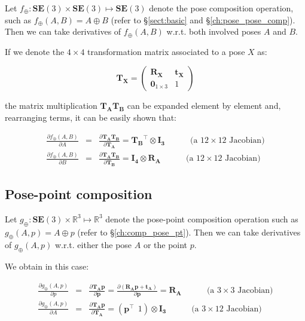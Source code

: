 \documentclass[a4paper,11pt]{report}
\begin{document}
Let $f_\oplus: \mathbf{SE}(3) \times \mathbf{SE}(3) \mapsto \mathbf{SE}(3)$ denote
the pose composition operation,
such as $f_\oplus(A,B) = A \oplus B$
(refer to \S\ref{sect:basic} and \S\ref{ch:pose_pose_comp}).
Then we can take derivatives of $f_\oplus(A,B)$ w.r.t. both involved poses $A$ and $B$.

If we denote the $4 \times 4$ transformation matrix associated to a pose $X$ as:

\begin{equation}
 \mathbf{T_X} =
\left(
\begin{array}{c|c}
  \mathbf{R_X} & \mathbf{t_X} \\
\hline
  \mathbf{0}_{1\times 3} & 1
\end{array}
\right)
\end{equation}

\noindent the matrix multiplication $\mathbf{T_A}\mathbf{T_B}$ can be
expanded element by element and, rearranging terms, it can be easily shown that:

\begin{eqnarray}
\label{eq:oplus.ab.wrt.a}
\frac{\partial f_\oplus(A,B) }{\partial A } &=&
\frac{\partial \mathbf{T_A}\mathbf{T_B} }{\partial \mathbf{T_A} } = \mathbf{T_B}^\top \otimes \mathbf{I_3}
\quad \quad \quad
\text{(a $12 \times 12$ Jacobian)}
\\
\label{eq:oplus.ab.wrt.b}
\frac{\partial f_\oplus(A,B) }{\partial B } &=&
\frac{\partial \mathbf{T_A}\mathbf{T_B} }{\partial \mathbf{T_B} } =
\mathbf{I_4} \otimes   \mathbf{R_A}
\quad \quad \quad
\text{(a $12 \times 12$ Jacobian)}
\end{eqnarray}


\subsection{Pose-point composition}

Let $g_\oplus: \mathbf{SE}(3) \times \mathbb{R}^3 \mapsto \mathbb{R}^3$ denote
the pose-point composition operation
such as $g_\oplus(A,p) = A \oplus p$
(refer to \S\ref{ch:comp_pose_pt}).
Then we can take derivatives of $g_\oplus(A,p)$ w.r.t. either the pose $A$ or the point $p$.

We obtain in this case:

\begin{eqnarray}
\label{eq:jac_dAp_p}
\frac{\partial g_\oplus(A,p) }{\partial p } &=&
\frac{\partial \mathbf{T_A}\mathbf{p} }{\partial \mathbf{p} } =
\frac{\partial (\mathbf{R_A}\mathbf{p} + \mathbf{t_A})}{\partial \mathbf{p} } =
\mathbf{R_A}
\quad \quad \quad
\text{(a $3 \times 3$ Jacobian)}
\\
\label{eq:jac_dAp_A}
\frac{\partial g_\oplus(A,p) }{\partial A } &=&
\frac{\partial \mathbf{T_A}\mathbf{p} }{\partial \mathbf{T_A} } =
\left( \mathbf{p}^\top ~~ 1 \right) \otimes \mathbf{I_3}
\quad \quad \quad
\text{(a $3 \times 12$ Jacobian)}
\end{eqnarray}
\end{document}
